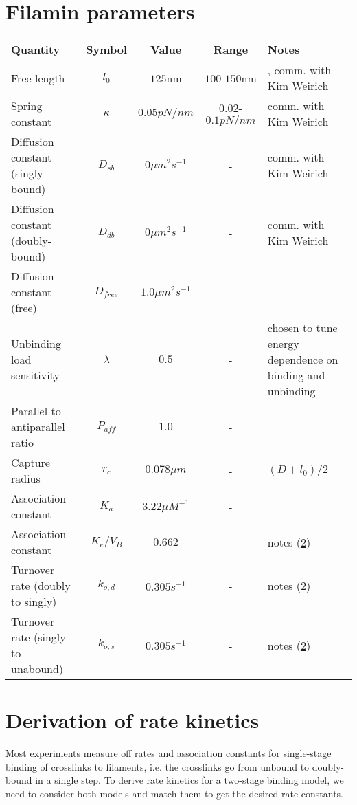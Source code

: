 \documentclass{article}[12pt]
\begin{document}
\newpage
\section{Filamin parameters} 
\vspace{0.5cm}
\begin{tabularx}{\textwidth}{| X | c| c | c| X |} %
	\hline
	\textbf{Quantity} & \textbf{Symbol} & \textbf{Value} & \textbf{Range} & \textbf{Notes}\\
	\hline
	 Free length & $l_0$ & $125$nm  & $100$-$150$nm & \cite{weirich2017liquid}, comm. with Kim Weirich\\
	 Spring constant & $\kappa$ & $0.05pN/nm$  & $0.02$-$0.1 pN/nm$ & comm. with Kim Weirich\\
	 Diffusion constant (singly-bound) & $D_{sb}$ & $0 \mu m^2 s^{-1}$ & - & comm. with Kim Weirich \\
	 Diffusion constant (doubly-bound) & $D_{db}$ & $0 \mu m^2 s^{-1}$ & - & comm. with Kim Weirich \\
	 Diffusion constant (free) & $D_{free}$ & $1.0 \mu m^2 s^{-1}$ & - &  \\
	 Unbinding load sensitivity & $\lambda$ & $0.5$ & - & chosen to tune energy dependence on binding and unbinding  \\
	 Parallel to antiparallel ratio & $P_{aff}$ & $1.0$ & - &  \\
	 Capture radius & $r_c$ & $0.078 \mu m$ & - &  $(D+l_0)/2$\\
	 Association constant & $K_a$ & $3.22 \mu M^{-1} $ & - & \cite{nakamura2007structural} \\
	 Association constant & $K_e / V_B$ & $0.662$ & - &  notes (\ref{sec:rate_kinetics})\\
	 Turnover rate (doubly to singly) & $k_{o,d}$ & $0.305 s^{-1}$ & - &  notes (\ref{sec:rate_kinetics})\\
	 Turnover rate (singly to unabound) & $k_{o,s}$ & $0.305 s^{-1}$ & - &  notes (\ref{sec:rate_kinetics})\\
	 \hline
\end{tabularx}
\vspace{0.5cm}
\section{Derivation of rate kinetics} \label{sec:rate_kinetics}

Most experiments measure off rates and association constants for single-stage binding of crosslinks to filaments, i.e. the crosslinks go from unbound to doubly-bound in a single step. To derive rate kinetics for a two-stage binding model, we need to consider both models and match them to get the desired rate constants. 
\end{document}
